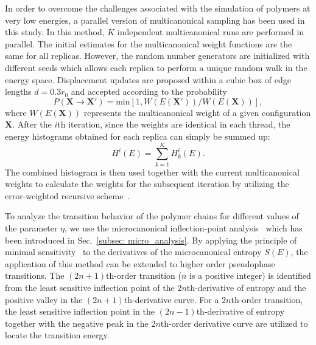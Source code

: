 \documentclass[12pt]{report}
\begin{document}
\newpage
In order to overcome the challenges associated with the simulation of polymers at very low energies, a parallel version of multicanonical sampling \cite{muca1a,muca2,Zierenberg2013} has been used in this study. In this method, $K$ independent multicanonical runs are performed in parallel. The initial estimates for the multicanonical weight functions are the same for all replicas. However, the random number generators are initialized with different seeds which allows each replica to perform a unique random walk in the energy space. Displacement updates are proposed within a cubic box of edge lengths $d=0.3r_0$ and accepted according to the probability
%
\begin{equation}
P(\mathbf{{X}} \rightarrow \mathbf{X}')= \mathrm{min}[1,W(E( \mathbf{X}'))/W(E( \mathbf{X}))],
\end{equation}
%
where $W(E( \mathbf{X}))$ represents the multicanonical weight of a given configuration $ \mathbf{X}$. After the $i$th iteration, since the weights are identical in each thread, the energy histograms obtained for each replica can simply be summed up:
%
\begin{equation}
    H^i(E)=\sum^K_{k=1}H^i_k(E). 
\end{equation}
%
The combined histogram is then used together with the current multicanonical weights to calculate the weights for the subsequent iteration by utilizing the error-weighted recursive
scheme~\cite{Bachmann2014,muca1a,muca2}. 

To analyze the transition behavior of the polymer chains for different values of the parameter $\eta$, we use the microcanonical inflection-point analysis~\cite{Bachmann2014,Schnabel2011} which has been introduced in Sec.~\ref{subsec: micro_analysis}. By applying the principle of minimal sensitivity~\cite{Stevenson} to the derivatives of the microcanonical entropy $S(E)$, the application of this method can be extended to higher order pseudophase transitions. The $(2n+1)$th-order transition ($n$ is a positive integer) is identified from the least sensitive inflection point of the $2n$th-derivative of entropy and the positive valley in the $(2n+1)$th-derivative curve. For a $2n$th-order transition, the least sensitive inflection point in the $(2n-1)$th-derivative of entropy together with the negative peak in the $2n$th-order derivative curve are utilized to locate the transition energy. 
%
\end{document}
